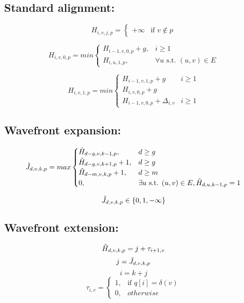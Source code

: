 \documentclass{article}
\begin{document}
    \subsection{Standard alignment:}
    \begin{equation}
        H_{i,v,j,p} = \begin{cases}
            + \infty & \text{if } v \notin p
        \end{cases}
    \end{equation}

    \begin{equation}
        H_{i,v,0,p} = min \begin{cases}
            H_{i-1,v,0,p} + g, & i \ge 1 \\
            H_{i,u,1,p}, & \forall u \text{ s.t. } (u, v) \in E
        \end{cases}
    \end{equation}
    

    \begin{equation}
        H_{i,v,1,p} = min \begin{cases}
            H_{i-1,v,1,p} + g & i \ge 1 \\
            H_{i,v,0,p} + g \\
            H_{i-1,v,0,p} + \Delta_{i,v} & i\ge 1 
        \end{cases}
    \end{equation}

    \subsection{Wavefront expansion:}
    \begin{equation}
        \Tilde{J}_{d,v,k,p} = max \begin{cases}
            \Tilde{H}_{d-g,v,k-1,p}, & d \ge g\\
            \Tilde{H}_{d-g,v,k+1,p} + 1, & d \ge g\\
            \Tilde{H}_{d-m,v,k,p} + 1, & d \ge m\\
            0, & \exists u \text{ s.t. } (u, v) \in E, \Tilde{H}_{d,u,k - 1,p} = 1
        \end{cases}
    \end{equation}

    $$\Tilde{J}_{d,v,k,p} \in \{0, 1, -\infty\}$$

    \subsection{Wavefront extension:}
    \begin{equation}
        \Tilde{H}_{d,v,k,p} = j + \tau_{i+1, v} 
    \end{equation}
    $$j = \Tilde{J}_{d,v,k,p}$$
    $$i = k + j$$
    $$\tau_{i,v} = \begin{cases}
        1, & \text{if } q[i] = \delta(v) \\
        0, & otherwise
    \end{cases}$$
\end{document}
